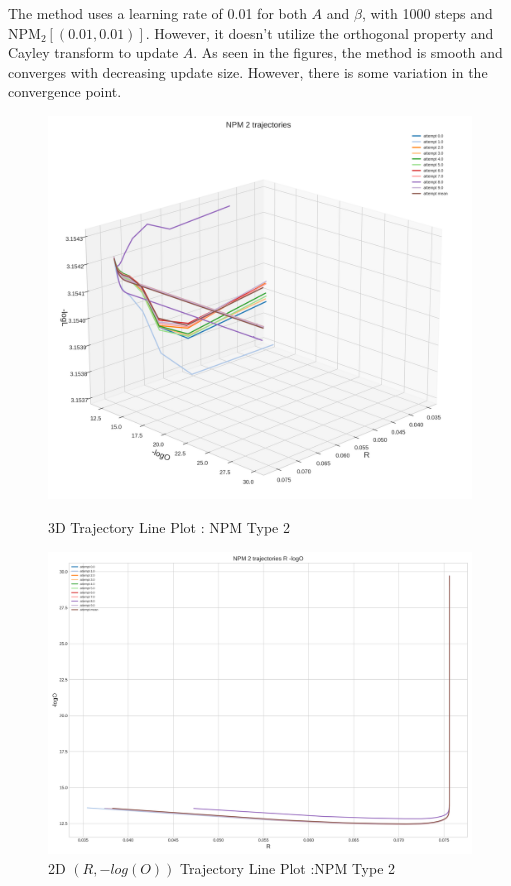 The method uses a learning rate of 0.01 for both $A$ and $\beta$, with 1000 steps and NPM$_2[(0.01,0.01)]$. However, it doesn't utilize the orthogonal property and Cayley transform to update $A$. As seen in the figures, the method is smooth and converges with decreasing update size. However, there is some variation in the convergence point.
\begin{figure}[H]
    \centering
    \begin{minipage}[t]{0.45\textwidth}
        \centering
        \includegraphics[width=\textwidth]{images/1-NPM 2 mean trajectory.png}
        \captionsetup{font=tiny}
        \caption{3D Trajectory Line Plot : NPM Type 2}
        \label{fig:cumulative_returns}
    \end{minipage}%
    \begin{minipage}[t]{0.5511\textwidth}
        \centering
        \includegraphics[width=\textwidth]{images/NPM 2 trajectories R -logO.png}
        \captionsetup{font=tiny}
        \caption{2D $(R,-log(O))$ Trajectory Line Plot :NPM Type 2}
        \label{fig:corr_matrix_ts_qrt_data}
    \end{minipage}
\end{figure} 
